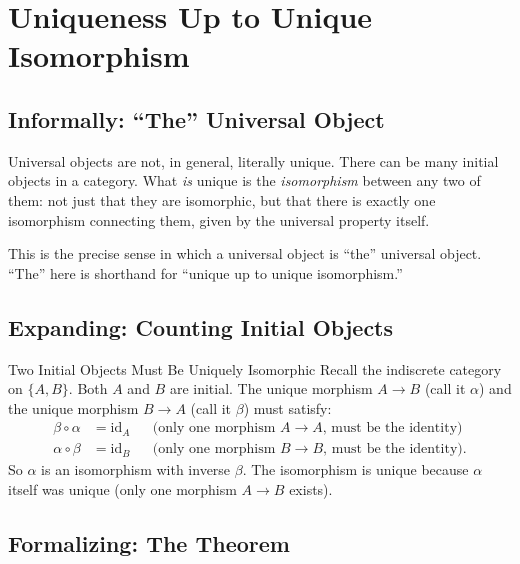 \section{Uniqueness Up to Unique Isomorphism}
\label{sec:uniqueness-iso}

\subsection{Informally: ``The'' Universal Object}

Universal objects are not, in general, literally unique. There can be many
initial objects in a category. What \emph{is} unique is the
\emph{isomorphism} between any two of them: not just that they are
isomorphic, but that there is exactly one isomorphism connecting them, given
by the universal property itself.

This is the precise sense in which a universal object is ``the'' universal
object. ``The'' here is shorthand for ``unique up to unique isomorphism.''

\subsection{Expanding: Counting Initial Objects}

\begin{example}{Two Initial Objects Must Be Uniquely Isomorphic}
Recall the indiscrete category on $\{A, B\}$. Both $A$ and $B$ are initial.
The unique morphism $A \to B$ (call it $\alpha$) and the unique morphism
$B \to A$ (call it $\beta$) must satisfy:
\begin{align*}
  \beta \circ \alpha &= \mathrm{id}_A
    && \text{(only one morphism $A \to A$, must be the identity)} \\
  \alpha \circ \beta &= \mathrm{id}_B
    && \text{(only one morphism $B \to B$, must be the identity)}.
\end{align*}
So $\alpha$ is an isomorphism with inverse $\beta$. The isomorphism is
unique because $\alpha$ itself was unique (only one morphism $A \to B$
exists).
\end{example}

\subsection{Formalizing: The Theorem}

